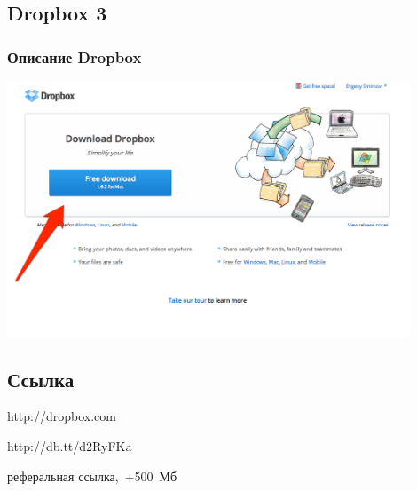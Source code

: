 \documentclass[compress,red]{beamer}
\begin{document}
\subsection{Dropbox 3}
\begin{frame}[fragile]
  \frametitle{Описание Dropbox}
  \centerline{\includegraphics[width=0.9\textwidth]{images/dropbox3.png}}
\end{frame}

\subsection{Ссылка}
\begin{frame}
  \begin{center}
    \Huge{http://dropbox.com}
  \end{center}
  \begin{center}
    \Huge{http://db.tt/d2RyFKa}
    
    \small{реферальная ссылка,~+500~Мб}
  \end{center}
\end{frame}
\end{document}
